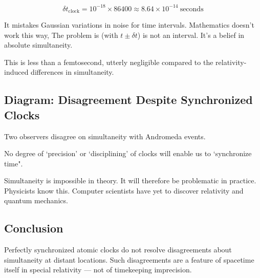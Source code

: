 \documentclass[../../../OAE-SPEC-MAIN.tex]{subfiles}
\begin{document}
\begin{equation}
\delta t_{\text{clock}} = 10^{-18} \times 86400 \approx 8.64 \times 10^{-14}\ \text{seconds}
\end{equation}


\begin{center}
\end{center}

\noindent It mistakes Gaussian variations in noise for time intervals. Mathematics doesn't work this way, The problem is (with $t \pm \delta t$) is not an interval. It's a belief in absolute simultaneity.  

\noindent This is less than a femtosecond, utterly negligible compared to the relativity-induced differences in simultaneity.

\subsection{Diagram: Disagreement Despite Synchronized Clocks}

\begin{marginfigure}
\centering
{}
\caption{Two observers disagree on simultaneity with Andromeda events.}
\end{marginfigure}


No degree of `precision' or `disciplining' of clocks will enable us to  `synchronize time". 

Simultaneity is impossible in theory. It will therefore be problematic  in practice.  Physicists know this. Computer scientists have yet to discover relativity and quantum mechanics. 

\subsection{Conclusion}

Perfectly synchronized atomic clocks do not resolve disagreements about simultaneity at distant locations. Such disagreements are a feature of spacetime itself in special relativity — not of timekeeping imprecision.
\end{document}
